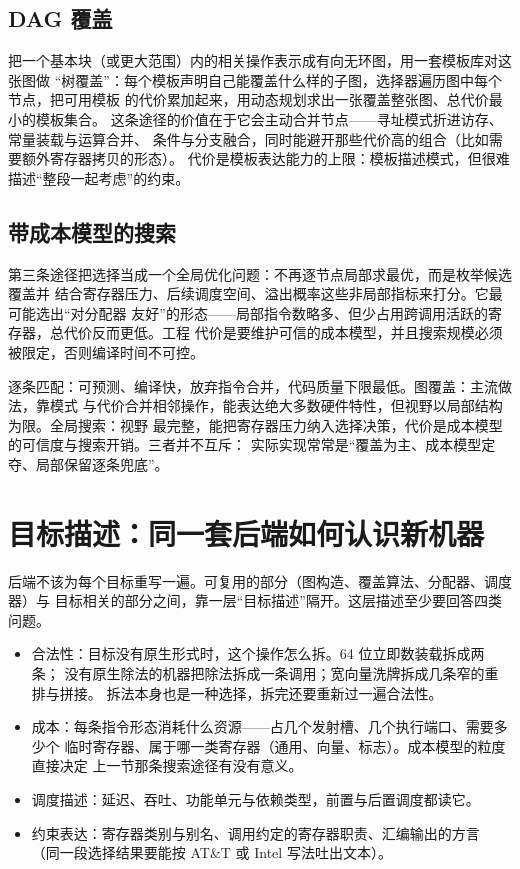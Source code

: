 \documentclass[12pt,a4paper,fontset=fandol]{ctexbook}
\begin{document}
\subsection{DAG 覆盖}\label{sec:cl06-dagcover}

把一个基本块（或更大范围）内的相关操作表示成有向无环图，用一套模板库对这张图做
“树覆盖”：每个模板声明自己能覆盖什么样的子图，选择器遍历图中每个节点，把可用模板
的代价累加起来，用动态规划求出一张覆盖整张图、总代价最小的模板集合。
这条途径的价值在于它会主动合并节点——寻址模式折进访存、常量装载与运算合并、
条件与分支融合，同时能避开那些代价高的组合（比如需要额外寄存器拷贝的形态）。
代价是模板表达能力的上限：模板描述模式，但很难描述“整段一起考虑”的约束。

\subsection{带成本模型的搜索}\label{sec:cl06-search}

第三条途径把选择当成一个全局优化问题：不再逐节点局部求最优，而是枚举候选覆盖并
结合寄存器压力、后续调度空间、溢出概率这些非局部指标来打分。它最可能选出“对分配器
友好”的形态——局部指令数略多、但少占用跨调用活跃的寄存器，总代价反而更低。工程
代价是要维护可信的成本模型，并且搜索规模必须被限定，否则编译时间不可控。

\begin{compare}[title={三条途径的取舍}]
逐条匹配：可预测、编译快，放弃指令合并，代码质量下限最低。图覆盖：主流做法，靠模式
与代价合并相邻操作，能表达绝大多数硬件特性，但视野以局部结构为限。全局搜索：视野
最完整，能把寄存器压力纳入选择决策，代价是成本模型的可信度与搜索开销。三者并不互斥：
实际实现常常是“覆盖为主、成本模型定夺、局部保留逐条兜底”。
\end{compare}

\section{目标描述：同一套后端如何认识新机器}\label{sec:cl06-targetdesc}

后端不该为每个目标重写一遍。可复用的部分（图构造、覆盖算法、分配器、调度器）与
目标相关的部分之间，靠一层“目标描述”隔开。这层描述至少要回答四类问题。

\begin{itemize}
  \item 合法性：目标没有原生形式时，这个操作怎么拆。64 位立即数装载拆成两条；
        没有原生除法的机器把除法拆成一条调用；宽向量洗牌拆成几条窄的重排与拼接。
        拆法本身也是一种选择，拆完还要重新过一遍合法性。
  \item 成本：每条指令形态消耗什么资源——占几个发射槽、几个执行端口、需要多少个
        临时寄存器、属于哪一类寄存器（通用、向量、标志）。成本模型的粒度直接决定
        上一节那条搜索途径有没有意义。
  \item 调度描述：延迟、吞吐、功能单元与依赖类型，前置与后置调度都读它。
  \item 约束表达：寄存器类别与别名、调用约定的寄存器职责、汇编输出的方言
        （同一段选择结果要能按 AT\&T 或 Intel 写法吐出文本）。
\end{itemize}
\end{document}
